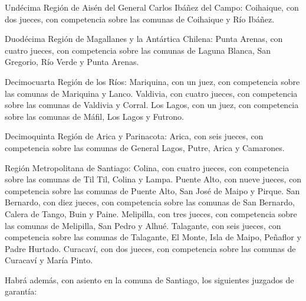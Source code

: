     Undécima Región de Aisén del General Carlos Ibáñez del Campo:
    Coihaique, con dos jueces, con competencia sobre las comunas de Coihaique y Río Ibáñez.

    Duodécima Región de Magallanes y la Antártica Chilena:
    Punta Arenas, con cuatro jueces, con competencia sobre las comunas de Laguna Blanca, San Gregorio, Río Verde y Punta Arenas.

    Decimocuarta Región de los Ríos:
    Mariquina, con un juez, con competencia sobre las comunas de Mariquina y Lanco.
    Valdivia, con cuatro jueces, con competencia sobre las comunas de Valdivia y Corral.
    Los Lagos, con un juez, con competencia sobre las comunas de Máfil, Los Lagos y Futrono.

    Decimoquinta Región de Arica y Parinacota:
    Arica, con seis jueces, con competencia sobre las comunas de General Lagos, Putre, Arica y Camarones.

    Región Metropolitana de Santiago:
    Colina, con cuatro jueces, con competencia sobre las comunas de Til Til, Colina y Lampa.
    Puente Alto, con nueve jueces, con competencia sobre las comunas de Puente Alto, San José de Maipo y Pirque.
    San Bernardo, con diez jueces, con competencia sobre las comunas de San Bernardo, Calera de Tango, Buin y Paine.
    Melipilla, con tres jueces, con competencia sobre las comunas de Melipilla, San Pedro y Alhué.
    Talagante, con seis jueces, con competencia sobre las comunas de Talagante, El Monte, Isla de Maipo, Peñaflor y Padre Hurtado.
    Curacaví, con dos jueces, con competencia sobre las comunas de Curacaví y María Pinto.

    Habrá además, con asiento en la comuna de Santiago, los siguientes juzgados de garantía:

